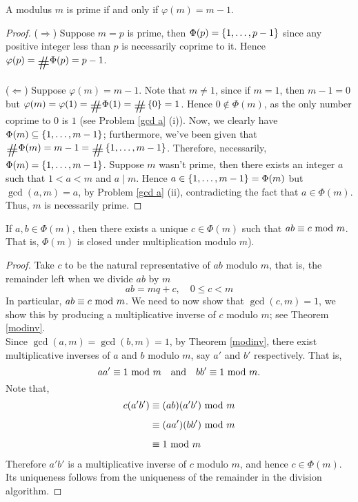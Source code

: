 \begin{proposition}
A modulus $m$ is prime if and only if $\varphi(m) = m-1$.
\end{proposition}
\begin{proof}
($\Rightarrow$) Suppose $m = p$ is prime, then $\Phi(p) = \left\{1,\ldots,p-1\right\}$ since any positive integer less than $p$ is necessarily coprime to it. Hence $\varphi(p) = \card\Phi(p) = p-1$.\\
\\
($\Leftarrow$) Suppose $\varphi(m) = m-1$. Note that $m \neq 1$, since if $m = 1$, then $m - 1 = 0$ but $\varphi(m) = \varphi(1) = \card\Phi(1) = \card\set{0} = 1$. Hence $0 \notin \Phi(m)$, as the only number coprime to $0$ is $1$ (see Problem \ref{gcd a} (i)). Now, we clearly have $\Phi(m) \subseteq \left\{1,\ldots,m-1\right\}$; furthermore, we've been given that $\card\Phi(m) = m - 1 = \card\set{1,\ldots,m-1}$. Therefore, necessarily, $\Phi(m) = \left\{1,\ldots,m-1\right\}$. Suppose $m$ wasn't prime, then there exists an integer $a$ such that $1< a < m$ and $a \mid m$. Hence $a \in \left\{1,\ldots,m-1\right\} = \Phi(m)$ but $\gcd(a,m) = a$, by Problem \ref{gcd a} (ii), contradicting the fact that $a \in \Phi(m)$. Thus, $m$ is necessarily prime. 
\end{proof}

\vspace*{1em}

\begin{proposition}
If $a,b \in \Phi(m)$, then there exists a unique $c \in \Phi(m)$ such that $ab \equiv c\text{ mod }{m}$. That is, $\Phi(m)$ is closed under multiplication modulo $m$).
\end{proposition}
\begin{proof}
Take $c$ to be the natural representative of $ab$ modulo $m$, that is, the remainder left when we divide $ab$ by $m$
\[ab = mq + c,\quad 0 \leq c < m\]
In particular, $ab \equiv c\text{ mod }{m}$. We need to now show that $\gcd(c,m) = 1$, we show this by producing a multiplicative inverse of $c$ modulo $m$; see Theorem \ref{modinv}.\\[1em]
Since $\gcd(a,m) = \gcd(b,m) = 1$, by Theorem \ref{modinv}, there exist multiplicative inverses of $a$ and $b$ modulo $m$, say $a'$ and $b'$ respectively. That is,
\[aa'\equiv 1 \text{ mod }{m}\quad \text{and} \quad bb'\equiv 1 \text{ mod }{m}.\]
Note that, 
\begin{align*}
c(a'b') &\equiv (ab)(a'b')\text{ mod }{m}\\[0.5em]
&\equiv (aa')(bb')\text{ mod }{m}\\[0.5em]
&\equiv 1\text{ mod }{m}
\end{align*}
Therefore $a'b'$ is a multiplicative inverse of $c$ modulo $m$, and hence $c\in \Phi(m)$. Its uniqueness follows from the uniqueness of the remainder in the division algorithm.
\end{proof}


